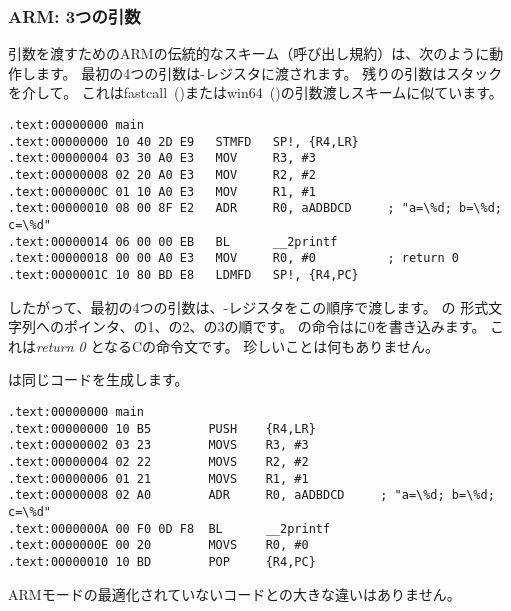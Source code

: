 \subsubsection{ARM: 3つの引数}

引数を渡すためのARMの伝統的なスキーム（呼び出し規約）は、次のように動作します。
最初の4つの引数は-レジスタに渡されます。 残りの引数はスタックを介して。 
これはfastcall~()またはwin64~()の引数渡しスキームに似ています。


\mysubparagraph{\NonOptimizingKeilVI (\ARMMode)}

\begin{lstlisting}[caption=\NonOptimizingKeilVI (\ARMMode),style=customasmARM]
.text:00000000 main
.text:00000000 10 40 2D E9   STMFD   SP!, {R4,LR}
.text:00000004 03 30 A0 E3   MOV     R3, #3
.text:00000008 02 20 A0 E3   MOV     R2, #2
.text:0000000C 01 10 A0 E3   MOV     R1, #1
.text:00000010 08 00 8F E2   ADR     R0, aADBDCD     ; "a=\%d; b=\%d; c=\%d"
.text:00000014 06 00 00 EB   BL      __2printf
.text:00000018 00 00 A0 E3   MOV     R0, #0          ; return 0
.text:0000001C 10 80 BD E8   LDMFD   SP!, {R4,PC}
\end{lstlisting}

したがって、最初の4つの引数は、-レジスタをこの順序で渡します。
の \printf 形式文字列へのポインタ、の1、の2、の3の順です。 
の命令はに0を書き込みます。 これは\emph{return 0} となるCの命令文です。 
珍しいことは何もありません。

\OptimizingKeilVI は同じコードを生成します。

\mysubparagraph{\OptimizingKeilVI (\ThumbMode)}

\begin{lstlisting}[caption=\OptimizingKeilVI (\ThumbMode),style=customasmARM]
.text:00000000 main
.text:00000000 10 B5        PUSH    {R4,LR}
.text:00000002 03 23        MOVS    R3, #3
.text:00000004 02 22        MOVS    R2, #2
.text:00000006 01 21        MOVS    R1, #1
.text:00000008 02 A0        ADR     R0, aADBDCD     ; "a=\%d; b=\%d; c=\%d"
.text:0000000A 00 F0 0D F8  BL      __2printf
.text:0000000E 00 20        MOVS    R0, #0
.text:00000010 10 BD        POP     {R4,PC}
\end{lstlisting}

ARMモードの最適化されていないコードとの大きな違いはありません。

\label{ARM_B_to_printf}

